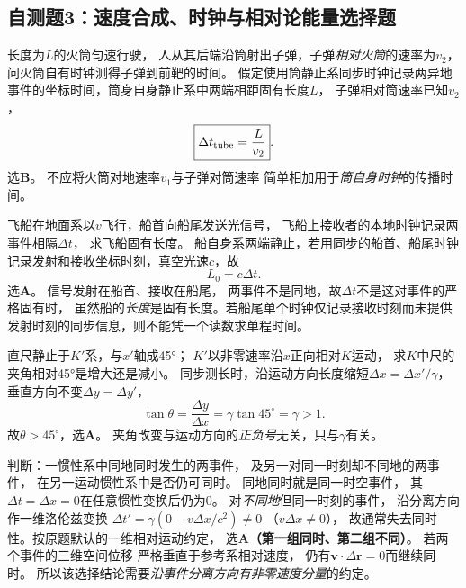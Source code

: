 
\subsection{自测题3：速度合成、时钟与相对论能量选择题}

\problemtext 长度为$L$的火筒匀速行驶，
人从其后端沿筒射出子弹，子弹\emph{相对火筒}的速率为$v_2$，
问火筒自有时钟测得子弹到前靶的时间。
\workings
假定使用筒静止系同步时钟记录两异地事件的坐标时间，筒身自身静止系中两端相距固有长度$L$，
子弹相对筒速率已知$v_2$，
\[
\boxed{\Delta t_{\rm tube}=\frac L{v_2}}.
\]
选\textbf{B}。
\crosscheck 不应将火筒对地速率$v_1$与子弹对筒速率
简单相加用于\emph{筒自身时钟}的传播时间。

\problemtext 飞船在地面系以$v$飞行，船首向船尾发送光信号，
飞船上接收者的本地时钟记录两事件相隔$\Delta t$，
求飞船固有长度。
\workings
船自身系两端静止，若用同步的船首、船尾时钟记录发射和接收坐标时刻，真空光速$c$，故
\[
\boxed{L_0=c\Delta t}.
\]
选\textbf{A}。
\crosscheck 信号发射在船首、接收在船尾，
两事件不是同地，故$\Delta t$不是这对事件的严格固有时，
虽然船的\emph{长度}是固有长度。若船尾单个时钟仅记录接收时刻而未提供发射时刻的同步信息，则不能凭一个读数求单程时间。

\problemtext 直尺静止于$K'$系，与$x'$轴成45°；
$K'$以非零速率沿$x$正向相对$K$运动，
求$K$中尺的夹角相对45°是增大还是减小。
\workings
同步测长时，沿运动方向长度缩短$\Delta x=\Delta x'/\gamma$，
垂直方向不变$\Delta y=\Delta y'$，
\[
\tan\theta=\frac{\Delta y}{\Delta x}
=\gamma\tan45^\circ=\gamma>1.
\]
故$\boxed{\theta>45^\circ}$，选\textbf{A}。
\crosscheck 夹角改变与运动方向的\emph{正负号}无关，只与$\gamma$有关。

\problemtext 判断：一惯性系中同地同时发生的两事件，
及另一对同一时刻却不同地的两事件，
在另一运动惯性系中是否仍可同时。
\workings
同地同时就是同一时空事件，
其$\Delta t=\Delta x=0$在任意惯性变换后仍为0。
对\emph{不同地}但同一时刻的事件，
沿分离方向作一维洛伦兹变换
$\Delta t'=\gamma(0-v\Delta x/c^2)\ne0$
（$v\Delta x\ne0$），
故通常失去同时性。按原题默认的一维相对运动约定，
选\textbf{A（第一组同时、第二组不同）}。
\crosscheck 若两个事件的三维空间位移
严格垂直于参考系相对速度，
仍有$\bm v\cdot\Delta\bm r=0$而继续同时。
所以该选择结论需要\emph{沿事件分离方向有非零速度分量}的约定。

